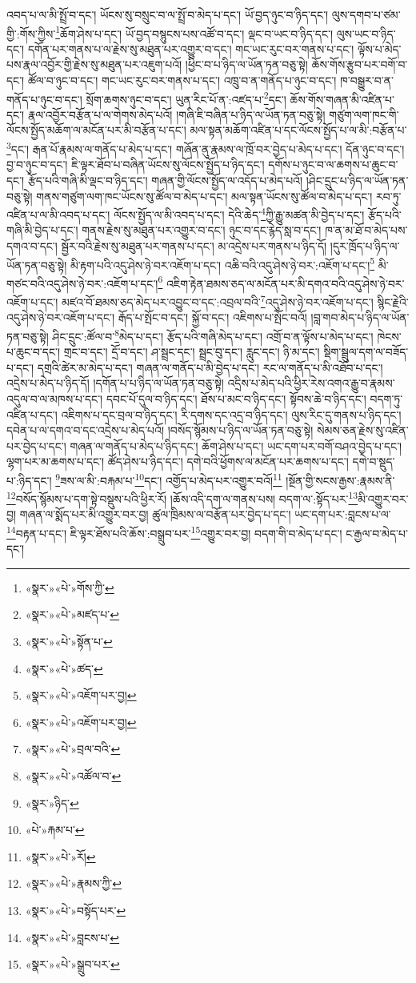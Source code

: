 འབད་པ་ལ་མི་སྤྲོ་བ་དང་། ཡོངས་སུ་བསྲུང་བ་ལ་སྤྲོ་བ་མེད་པ་དང་། ཡོ་བྱད་ཉུང་བ་ཉིད་དང་། ལུས་དགབ་པ་ཙམ་གྱི་:གོས་ཀྱིས་\footnote{«སྣར་»«པེ་»གོས་ཀྱི་}ཆོག་ཤེས་པ་དང་། ཡོ་བྱད་བསྙུངས་པས་འཚོ་བ་དང་། ལྡང་བ་ཡང་བ་ཉིད་དང་། ལུས་ཡང་བ་ཉིད་དང་། དགོན་པར་གནས་པ་ལ་རྗེས་སུ་མཐུན་པར་འགྱུར་བ་དང་། གང་ཡང་རུང་བར་གནས་པ་དང་། ལྟོས་པ་མེད་པས་རྣལ་འབྱོར་གྱི་རྗེས་སུ་མཐུན་པར་འཇུག་པའོ། །ཕྱིང་བ་པ་ཉིད་ལ་ཡོན་ཏན་བཅུ་སྟེ། ཆོས་གོས་རྩུབ་པར་བགོ་བ་དང་། ཚོལ་བ་ཉུང་བ་དང་། གང་ཡང་རུང་བར་གནས་པ་དང་། འཁྲུ་བ་ན་གནོད་པ་ཉུང་བ་དང་། ཁ་བསྒྱུར་བ་ན་གནོད་པ་ཉུང་བ་དང་། སྲོག་ཆགས་ཉུང་བ་དང་། ཡུན་རིང་པོ་ན་:འཛད་པ་\footnote{«སྣར་»«པེ་»མཛད་པ་}དང་། ཆོས་གོས་གཞན་མི་འཛིན་པ་དང་། རྣལ་འབྱོར་བརྩོན་པ་ལ་གེགས་མེད་པའོ། །གཞི་ཇི་བཞིན་པ་ཉིད་ལ་ཡོན་ཏན་བཅུ་སྟེ། གཙུག་ལག་ཁང་གི་ལོངས་སྤྱོད་མཆོག་ལ་མངོན་པར་མི་བརྩོན་པ་དང་། མལ་སྟན་མཆོག་འཛིན་པ་དང་ལོངས་སྤྱོད་པ་ལ་མི་:བརྩོན་པ་\footnote{«སྣར་»«པེ་»སྟོན་པ་}དང་། རྒན་པོ་རྣམས་ལ་གནོད་པ་མེད་པ་དང་། གཞོན་ནུ་རྣམས་ལ་ཁྲོ་བར་བྱེད་པ་མེད་པ་དང་། དོན་ཉུང་བ་དང་། བྱ་བ་ཉུང་བ་དང་། ཇི་ལྟར་ཐོབ་པ་བཞིན་ཡོངས་སུ་ལོངས་སྤྱོད་པ་ཉིད་དང་། དགོས་པ་ཉུང་བ་ལ་ཆགས་པ་ཆུང་བ་དང་། རྩོད་པའི་གཞི་མི་ལྡང་བ་ཉིད་དང་། གཞན་གྱི་ལོངས་སྤྱོད་ལ་འདོད་པ་མེད་པའོ། །ཤིང་དྲུང་པ་ཉིད་ལ་ཡོན་ཏན་བཅུ་སྟེ། གནས་གཙུག་ལག་ཁང་ཡོངས་སུ་ཚོལ་བ་མེད་པ་དང་། མལ་སྟན་ཡོངས་སུ་ཚོལ་བ་མེད་པ་དང་། རབ་ཏུ་འཛིན་པ་ལ་མི་འབད་པ་དང་། ལོངས་སྤྱོད་ལ་མི་འབད་པ་དང་། དེའི་ཆེད་\footnote{«སྣར་»«པེ་»ཚད་}ཀྱི་རྒྱུ་མཚན་མི་བྱེད་པ་དང་། རྩོད་པའི་གཞི་མི་བྱེད་པ་དང་། གནས་རྗེས་སུ་མཐུན་པར་འགྱུར་བ་དང་། ཉུང་བ་དང་རྙེད་སླ་བ་དང་། ཁ་ན་མ་ཐོ་བ་མེད་པས་དགའ་བ་དང་། སྦྱོར་བའི་རྗེས་སུ་མཐུན་པར་གནས་པ་དང་། མ་འདྲེས་པར་གནས་པ་ཉིད་དོ། །དུར་ཁྲོད་པ་ཉིད་ལ་ཡོན་ཏན་བཅུ་སྟེ། མི་རྟག་པའི་འདུ་ཤེས་ཉེ་བར་འཇོག་པ་དང་། འཆི་བའི་འདུ་ཤེས་ཉེ་བར་:འཇོག་པ་དང་།\footnote{«སྣར་»«པེ་»འཇོག་པར་བྱ།} མི་གཙང་བའི་འདུ་ཤེས་ཉེ་བར་:འཇོག་པ་དང་།\footnote{«སྣར་»«པེ་»འཇོག་པར་བྱ།} འཇིག་རྟེན་ཐམས་ཅད་ལ་མངོན་པར་མི་དགའ་བའི་འདུ་ཤེས་ཉེ་བར་འཇོག་པ་དང་། མཛའ་བོ་ཐམས་ཅད་མེད་པར་འབྱུང་བ་དང་:འབྲལ་བའི་\footnote{«སྣར་»«པེ་»བྲལ་བའི་}འདུ་ཤེས་ཉེ་བར་འཇོག་པ་དང་། སྙིང་རྗེའི་འདུ་ཤེས་ཉེ་བར་འཇོག་པ་དང་། རྒོད་པ་སྤོང་བ་དང་། སྐྱོ་བ་དང་། འཇིགས་པ་སྤོང་བའོ། །བླ་གབ་མེད་པ་ཉིད་ལ་ཡོན་ཏན་བཅུ་སྟེ། ཤིང་དྲུང་:ཚོལ་བ་\footnote{«སྣར་»«པེ་»འཚོལ་བ་}མེད་པ་དང་། རྩོད་པའི་གཞི་མེད་པ་དང་། འགྲོ་བ་ན་ལྟོས་པ་མེད་པ་དང་། ཁེངས་པ་ཆུང་བ་དང་། གྲང་བ་དང་། དྲོ་བ་དང་། ཤ་སྦྲང་དང་། སྦྲང་བུ་དང་། རླུང་དང་། ཉི་མ་དང་། སྡིག་སྦྲུལ་དག་ལ་བཟོད་པ་དང་། དགྲའི་ཚེར་མ་མེད་པ་དང་། གཞན་ལ་གནོད་པ་མི་བྱེད་པ་དང་། རང་ལ་གནོད་པ་མི་འཐོབ་པ་དང་། འདྲེས་པ་མེད་པ་ཉིད་དོ། །དགོན་པ་པ་ཉིད་ལ་ཡོན་ཏན་བཅུ་སྟེ། འདྲིས་པ་མེད་པའི་ཕྱིར་རེས་འགའ་རྒྱུ་བ་རྣམས་འདུལ་བ་ལ་མཁས་པ་དང་། དབང་པོ་དུལ་བ་ཉིད་དང་། ཐོས་པ་མང་བ་ཉིད་དང་། སྟོབས་ཆེ་བ་ཉིད་དང་། བདག་ཏུ་འཛིན་པ་དང་། འཇིགས་པ་དང་བྲལ་བ་ཉིད་དང་། རི་དགས་དང་འདྲ་བ་ཉིད་དང་། ལུས་རིང་དུ་གནས་པ་ཉིད་དང་། དབེན་པ་ལ་དགའ་བ་དང་འདྲེས་པ་མེད་པའོ། །བསོད་སྙོམས་པ་ཉིད་ལ་ཡོན་ཏན་བཅུ་སྟེ། སེམས་ཅན་རྗེས་སུ་འཛིན་པར་བྱེད་པ་དང་། གཞན་ལ་གནོད་པ་མེད་པ་ཉིད་དང་། ཆོག་ཤེས་པ་དང་། ཡང་དག་པར་བགོ་བཤའ་བྱེད་པ་དང་། ལྷག་པར་མ་ཆགས་པ་དང་། ཚོད་ཤེས་པ་ཉིད་དང་། དགེ་བའི་ཕྱོགས་ལ་མངོན་པར་ཆགས་པ་དང་། དགེ་བ་སྡུད་པ་:ཉིད་དང་། \footnote{«སྣར་»ཉིད་}ཟས་ལ་མི་:བརྐམ་པ་\footnote{«པེ་»རྐམ་པ་}དང་། འགྱོད་པ་མེད་པར་འགྱུར་བའོ།\footnote{«སྣར་»«པེ་»རོ།} །སྔོན་གྱི་སངས་རྒྱས་:རྣམས་ནི་\footnote{«སྣར་»«པེ་»རྣམས་ཀྱི་}བསོད་སྙོམས་པ་དག་སྟེ་བསྡུས་པའི་ཕྱིར་རོ། །ཆོས་འདི་དག་ལ་གནས་པས། བདག་ལ་:སྟོད་པར་\footnote{«སྣར་»«པེ་»བསྟོད་པར་}མི་འགྱུར་བར་བྱ། གཞན་ལ་སྨོད་པར་མི་འགྱུར་བར་བྱ། ཚུལ་ཁྲིམས་ལ་བརྩོན་པར་བྱེད་པ་དང་། ཡང་དག་པར་:བླངས་པ་ལ་\footnote{«སྣར་»«པེ་»བླངས་པ་}བརྟན་པ་དང་། ཇི་ལྟར་ཐོས་པའི་ཆོས་:བསྒྲུབ་པར་\footnote{«སྣར་»«པེ་»སྒྲུབ་པར་}འགྱུར་བར་བྱ། བདག་གི་བ་མེད་པ་དང་། ང་རྒྱལ་བ་མེད་པ་དང་། 